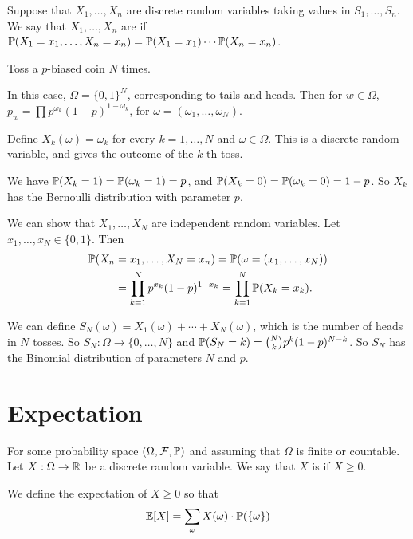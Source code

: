 \documentclass[a4paper]{scrreprt}
\begin{document}
\begin{definition}[Independence]
	Suppose that $X_1, \dots, X_n$ are discrete random variables taking values in $S_1, \dots, S_n$. We say that $X_1, \dots, X_n$ are  if $\mathbb{P}(X_1 = x_1, \dots, X_n = x_n) =\mathbb{P}(X_1 = x_1) \cdots \mathbb{P}(X_n = x_n)$.
\end{definition}

\begin{example}
	Toss a $p$-biased coin $N$ times. 

	In this case, $\Omega = \{0, 1\}^N$, corresponding to tails and heads. Then for $w \in \Omega$, $p_w = \prod p^{\omega_k} (1 - p)^{1 - \omega_k}$, for $\omega = (\omega_1, \dots, \omega_N)$.

	Define $X_k(\omega) = \omega_k$ for every $k = 1, \dots, N$ and $\omega \in \Omega$. This is a discrete random variable, and gives the outcome of the $k$-th toss.

	We have $\mathbb{P}(X_k = 1) = \mathbb{P}(\omega_k = 1) = p$, and $\mathbb{P}(X_k = 0) = \mathbb{P}(\omega_k = 0) = 1- p$. So $X_k$ has the Bernoulli distribution with parameter $p$.

	We can show that $X_1, \dots, X_N$ are independent random variables. Let $x_1, \dots, x_N \in \{0, 1\}$. Then
	\begin{align*}
	\mathbb{P}(X_n &= x_1, \dots, X_N = x_n) = \mathbb{P}(\omega = (x_1, \dots, x_N)) \\
			&= \prod_{k=1}^N p^{x_k} (1 - p)^{1 - x_k} = \prod_{k = 1}^{N} \mathbb{P}(X_k = x_k).
\end{align*}

We can define $S_N(\omega) = X_1(\omega) + \cdots + X_N(\omega)$, which is the number of heads in $N$ tosses. So $S_N : \Omega \rightarrow \{0, \dots, N\}$ and $\mathbb{P}(S_N = k) = \binom{N}{k}p^k (1 - p)^{N - k}$. So $S_N$ has the Binomial distribution of parameters $N$ and $p$.

\end{example}

\section{Expectation}

For some probability space $(\Omega, \mathcal{F}, \mathbb{P})$ and assuming that $\Omega$ is finite or countable. Let $X : \Omega \rightarrow \mathbb{R}$ be a discrete random variable. We say that $X$ is  if $X \geq 0$.

\begin{definition}[Expectation]
	We define the expectation of $X \geq 0$ so that
	$$
	\mathbb{E}[X] = \sum_{\omega} X(\omega) \cdot \mathbb{P}(\{\omega\})
	$$
\end{definition}
\end{document}
